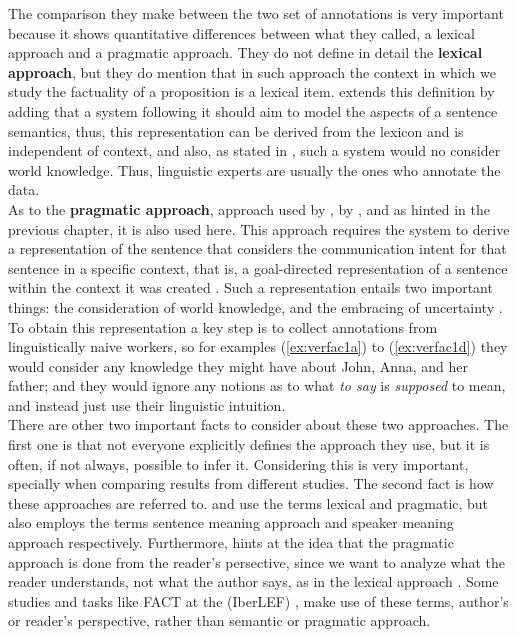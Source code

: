 The comparison they make between the two set of annotations is very important because it shows quantitative differences between what they called, a lexical approach and a pragmatic approach. They do not define in detail the \textbf{lexical approach}, but they do mention that in such approach the context in which we study the factuality of a proposition is a lexical item. \citet{ross2019well} extends this definition by adding that a system following it should aim to model the aspects of a sentence semantics, thus, this representation can be derived from the lexicon and is independent of context, and also, as stated in \citet{sauri2009factbank}, such a system would no consider world knowledge. Thus, linguistic experts are usually the ones who annotate the data.\\ 

As to the \textbf{pragmatic approach}, approach used by \citet{de2012did}, by \citet{ross2019well}, and as hinted in the previous chapter, it is also used here. This approach requires the system to derive a representation of the sentence that considers the communication intent for that sentence in a specific context, that is, a goal-directed  representation of a sentence within the context it was created \citep{ross2019well}. Such a representation entails two important things: the consideration of world knowledge, and the embracing of uncertainty \citep{de2012did}. To obtain this representation a key step is to collect annotations from linguistically naive workers, so for examples (\ref{ex:verfac1a}) to (\ref{ex:verfac1d}) they would consider any knowledge they might have about John, Anna, and her father; and they would ignore any notions as to what \textit{to say} is \textit{supposed} to mean, and instead just use their linguistic intuition.\\

There are other two important facts to consider about these two approaches. The first one is that not everyone explicitly defines the approach they use, but it is often, if not always, possible to infer it. Considering this is very important, specially when comparing results from different studies. The second fact is how these approaches are referred to. \citet{de2012did} and \citet{ross2019well} use the terms lexical and pragmatic, but \citet{ross2019well} also employs the terms sentence meaning approach and speaker meaning approach respectively. Furthermore, \citet{de2012did} hints at the idea that the pragmatic approach is done from the reader's persective, since we want to analyze what the reader understands, not what the author says, as in the lexical approach \citep{sauri2009factbank}. Some studies and tasks like FACT at the  (IberLEF) \citep{rosa2019overview}, make use of these terms, author's or reader's perspective, rather than semantic or pragmatic approach.\\

